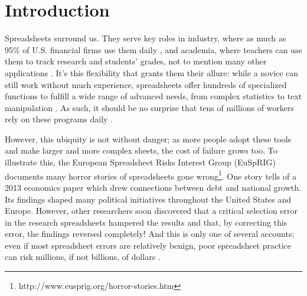 \documentclass[conference]{IEEEtran}
\newcommand{\toolnameend}{Perquimans}
\newcommand{\toolnameposs}{Perquimans' }
\begin{document}
	\begin{abstract} 
		Spreadsheet environments often come equipped with an abundance of functions
		and operations to manipulate data, which users can combine into a complex
		formulae for more sophisticated programs. However, anticipating these
		combinations is difficult, complicating matters for both researchers and
		practitioners who want to study formulae to improve spreadsheet practices.
		Therefore, we developed \toolnameend, a tool that analyzes spreadsheet corpora
		to visualize patterns of function combination as an interactive tree, capable
		of representing both the most common and most anomalous patterns of formula
		construction and their contexts in actual workbooks. Using spreadsheets from
		the Enron corpus, we conduct both a case study and a user study to explore
		\toolnameposs various applications, particularly those in flexible smell
		detection and spreadsheet education.
		
	\end{abstract}
	
	\section{Introduction} Spreadsheets surround us. They serve key roles in
	industry, where as much as 95\% of U.S. financial firms use them daily
	\cite{panko2008sarbanes}, and academia, where teachers can use them to track
	research and students' grades, not to mention many other applications
	\cite{ko2011state}. It's this flexibility that grants them their allure: while
	a novice can still work without much experience, spreadsheets offer hundreds of
	specialized functions to fulfill a wide range of advanced needs, from complex
	statistics to text manipulation \cite{nardi1990spreadsheet}. As such, it should
	be no surprise that tens of millions of workers rely on these programs daily \cite{scaffidi2005estimating}.
	
	However, this ubiquity is not without danger; as more people adopt these tools
	and make larger and more complex sheets, the cost of failure grows too. To illustrate this, the European Spreadsheet Risks Interest Group (EuSpRIG) documents
	many horror stories of spreadsheets gone 
	wrong\footnote{http://www.eusprig.org/horror-stories.htm}. One story tells
	of a 2013 economics paper which drew connections between debt and
	national growth. Its findings shaped many political initiatives throughout the
	United States and Europe. However, other researchers soon discovered that a
	critical selection error in the research spreadsheets hampered the results and
	that, by correcting this error, the findings reversed completely! And this
	is only one of several accounts; even if most spreadsheet errors are relatively
	benign, poor spreadsheet practice can risk millions, if not billions, of
	dollars \cite{powell2009impact}.
	
\end{document}
